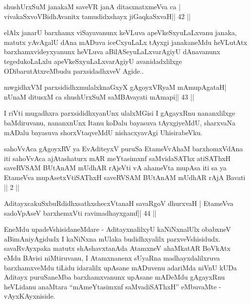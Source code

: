 \begin{shl}
shushUrxSuM janakaM saveVR janA ditasxnatxmeVva ca |
vivakaSxvoV\s BidhAvanitx tamudidxshayx jiGaqkaSxvaH\hfill || 42 ||
\end{shl}

\begin{artha}
elAlx janarU barxhamx viSayavanunx keVLuva apeVkeSxyuLaLxvanu janaka, matutx yAvAgalU dAna mADuva iceCxyuLaLx tAyxgi janakaneMdu heVLutAtx barxhamxvideyxyanunx heVLuva aBilASeyuLaLxvarAgiyU dAnavanunx tegedukoLaLxlu apeVkeSxyuLaLxvarAgiyU avanidadxlilxge ODibarutAtxreMbudu parxsidadhxveV Agide..
\end{artha}

\begin{shl}
mwgidhxVM parxsididhxmulalxknaGxyX gAgoyxVR\s yaM mAmupAgataH|
nUnaM ditusxM ca shushUrxSuM saMBAvayati mAmapi\hfill || 43 ||
\end{shl}

\begin{artha}
I riVti mugadhxra parxsididhxyanUnx ulalxMGisi I gAgayxRnu nananxlilxge baMdiruvanu, nananxnUnx Itanu koDalu bayasuva tAyxgiyeMdU, sharxvaNa mADalu bayasuva shorxVtaqveMdU nishacxyavAgi UhisirabeVku.
\end{artha}


\begin{kandikeshl}
sahoVvAca gAgoyxRV ya EvA\s diteyxV puruSa
EtameVvAhaM barxhomxVdAna iti sahoVvAca
ajAtashaturx mAR meYtasimxnf saMvidaSAThx atiSAThxH
saveRVSAM BUtAnAM mUdhAR rAjeVti vA
ahameVta mupAsa iti sa ya EtameVva
mupAsetxV\s tiSAThxH saveRVSAM BUtAnAM mUdhAR
rAjA Bavati || 2 ||
\end{kandikeshl}


\begin{shl}
AditayxcakuSxbuRdidhxsathxshecxVtanaH savaRgoV dhurxvaH |
EtameVva sadoVpAseV barxhemxVti ravimadhayxgamf\hfill || 44 ||
\end{shl}

\begin{artha}
EneMdu upadeVshisidaneMdare - AditayxnalilxyU kaNiNxnalUlx obabxneV 
aBimAniyAgidudx I kaNiNxna mUlaka budidhxyalilx parxveVshisidudx. 
savaRvAyxpaka matutx shAshavxtanAda AtamxneV ahaMkatAR BoVkAtx eMdu 
BAvisi niMtiruvanu, I Atamxnanenx sUyaRna madhayxdalilxruva 
barxhamxveMdu tiLidu idaralilx upAsane mADuvenu adariMda niVnU kUDa 
Aditayx puruSaneMba barxhamxvanunx upAsane mADeMdu gAgayxRnu heVLidanu 
anaMtara ``mAmeYtasimxnf saMvadiSAThxH'' eMbuvaMte - vAyxKAyxniside.
\end{artha}

